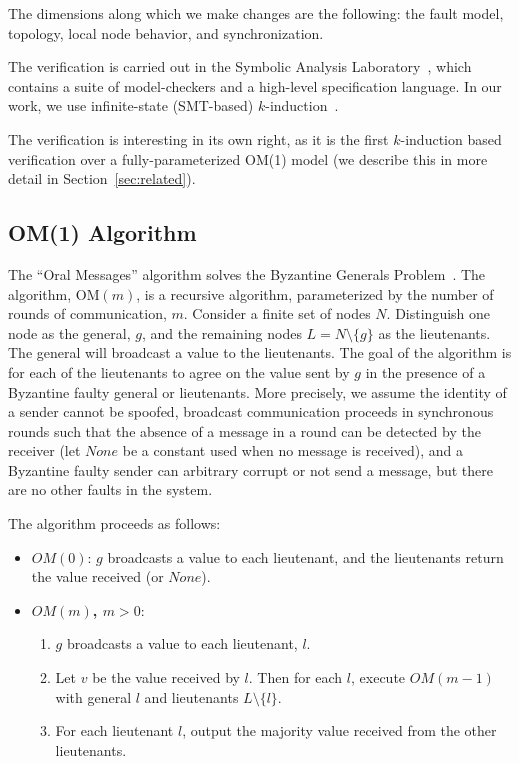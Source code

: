 \documentclass{llncs/llncs}
\newcommand{\OM}[1]{\ensuremath{\mathrm{OM}(#1)}}
\newcommand{\lee}[1]{ } %
\newcommand{\lee}[1]{ {\color{blue}$<$lee: #1$>$} } %
\begin{document}
The dimensions along which we make changes are the following: the fault model, topology, local node behavior, and synchronization. \lee{Did we complete these?}

The verification is carried out in the Symbolic Analysis Laboratory~\cite{}, which contains a suite of model-checkers and a high-level specification language. In our work, we use infinite-state (SMT-based) $k$-induction~\cite{}.

The verification is interesting in its own right, as it is the first $k$-induction based verification over a fully-parameterized OM(1) model (we describe this in more detail in Section~\ref{sec:related}).

\lee{also note that OM(1) underlies many real-world systems}

\subsection{OM(1) Algorithm}

\lee{rewrite this to be OMH}

The ``Oral Messages'' algorithm solves the Byzantine Generals
Problem~\cite{Lamport-OM}. The algorithm, $\OM{m}$, is a recursive algorithm, parameterized by the number of rounds of communication, $m$. Consider a finite set of nodes $N$. Distinguish one node as the general, $g$, and the remaining nodes $L = N \setminus \{g\}$ as the lieutenants. The general will broadcast a value to the lieutenants. The goal of the algorithm is for each of the lieutenants to agree on the value sent by $g$ in the presence of a Byzantine faulty general or lieutenants. More precisely, we assume the identity of a sender cannot be spoofed, broadcast communication proceeds in synchronous rounds such that the absence of a message in a round can be detected by the receiver (let $None$ be a constant used when no message is received), and a Byzantine faulty sender can arbitrary corrupt or not send a message, but there are no other faults in the system.

The algorithm proceeds as follows:

\begin{itemize}
\item {\bf $OM(0)$}: $g$ broadcasts a value to each lieutenant, and the lieutenants return the value received (or $None$).
\item {\bf $OM(m)$, $m > 0$}:
  \begin{enumerate}
  \item $g$ broadcasts a value to each lieutenant, $l$.
  \item\label{om:two} Let $v$ be the value received by $l$. Then for each $l$, execute $OM(m-1)$ with general $l$ and lieutenants $L \setminus \{l\}$.
  \item For each lieutenant $l$, output the majority value received from the other lieutenants.
  \end{enumerate}
\end{itemize}
\end{document}
